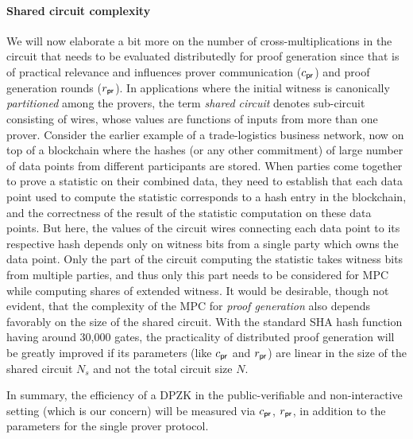 \paragraph{Shared circuit complexity}
We will now elaborate a bit more on the number of cross-multiplications in the circuit that needs to be evaluated distributedly for proof generation since
that is of practical relevance and influences prover communication ($c_\mathsf{pr}$)
and proof generation rounds ($r_\mathsf{pr}$). In applications where the initial
witness is canonically \textit{partitioned} among the provers, the term
\textit{shared circuit} denotes sub-circuit consisting of wires, whose 
values are functions of inputs from more than one prover. 
Consider the earlier example of a trade-logistics business network, now on top of 
a blockchain where the hashes (or any other commitment) of large number of data points
from different participants are stored. 
When parties come together to prove a statistic on their combined data, they
need to establish that each data point used to compute the statistic corresponds to a 
hash entry in the blockchain, and the correctness of the result of the statistic
computation on these data points. But here, the values of the circuit wires
connecting each data point to its respective hash depends only on witness bits from a 
single party which owns the data point. Only the part of the circuit computing the 
statistic takes witness bits from multiple parties, and thus only this part
needs to be considered for MPC while computing shares of extended witness. It
would be desirable, though not evident, that the complexity of the MPC for {\em proof
generation} also depends favorably on the size of the shared circuit. 
With the standard SHA hash function having around 30,000 gates, the practicality of 
distributed proof generation will be
greatly improved if its parameters (like $c_\mathsf{pr}$ and $r_\mathsf{pr}$) are 
linear in the size of the shared circuit $N_s$ and not the total circuit size $N$.

In summary, the efficiency of a DPZK in the public-verifiable and
non-interactive setting (which is our concern) will be measured via $c_\mathsf{pr}$,
$r_\mathsf{pr}$, in addition to the parameters for the single prover protocol.

